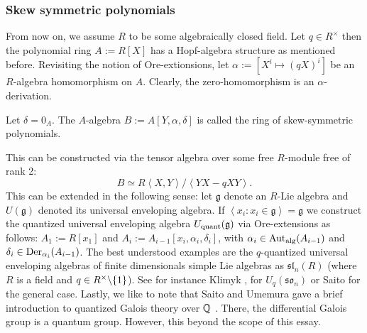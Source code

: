 \subsubsection{Skew symmetric polynomials}
From now on, we assume $R$ to be some algebraically closed field. Let $q \in R^\times$ then the polynomial ring $A := R[X]$ has a Hopf-algebra structure as mentioned before. Revisiting the notion of Ore-extionsions, let $\alpha := [X^i \longmapsto (q X)^i]$ be an $R$-algebra homomorphism on $A$. Clearly, the zero-homomorphism is an $\alpha$-derivation.
\begin{defi}
Let $\delta = 0_A$. The $A$-algebra $B := A[Y,\alpha,\delta]$ is called the ring of skew-symmetric polynomials.
\end{defi}
\bmk This can be constructed via the tensor algebra over some free $R$-module free of rank 2:
$$B \simeq R\left<X,Y\right>/\left<Y X - q X Y\right>.$$
This can be extended in the following sense: let $\mathfrak{g}$ denote an $R$-Lie algebra and $U(\mathfrak{g})$ denoted its universal enveloping algebra. If $\left<x_i : x_i \in \mathfrak{g}\right> = \mathfrak{g}$ we construct the quantized universal enveloping algebra $U_{\mathrm{quant}}(\mathfrak{g})$ via Ore-extensions as follows:
$A_1 := R[x_1]$ and $A_i := A_{i-1}[x_i,\alpha_i,\delta_i]$, with $\alpha_i \in \mathrm{Aut}_{\mathrm{alg}}(A_{i-1})$ and $\delta_i \in \mathrm{Der}_{\alpha_i}(A_{i-1})$.
 \bsp The best understood examples are the $q$-quantized universal enveloping algebras of finite dimensionals simple Lie algebras as $\mathfrak{sl}_n(R)$ (where $R$ is a field and $q \in R^\times\backslash\{1\}$). See for instance Klimyk \cite{Klim}, for $U_q(\mathfrak{so}_n)$ or Saito  \cite{Sait} for the general case.
\bmk Lastly, we like to note that Saito and Umemura gave a brief introduction to quantized Galois theory over $\mathbb{Q}$ \cite{SaitoUmemura,SaitoUmemura01}. There, the differential Galois group is a quantum group. However, this beyond the scope of this essay.